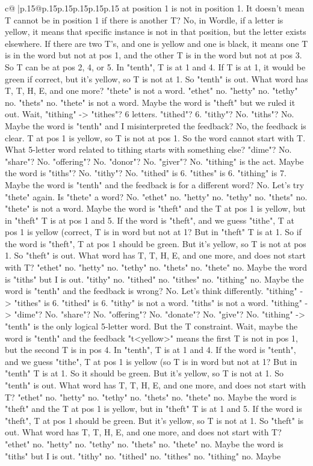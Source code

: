 \documentclass{article}
\begin{document}
{\begin{supertabular}{c@{$\;$}|p{.15\linewidth}@{}p{.15\linewidth}p{.15\linewidth}p{.15\linewidth}p{.15\linewidth}p{.15\linewidth}}
{{{at position 1 is not in position 1. It doesn't mean T cannot be in position 1 if there is another T? No, in Wordle, if a letter is yellow, it means that specific instance is not in that position, but the letter exists elsewhere. If there are two T's, and one is yellow and one is black, it means one T is in the word but not at pos 1, and the other T is in the word but not at pos 3. So T can be at pos 2, 4, or 5. In "tenth", T is at 1 and 4. If T is at 1, it would be green if correct, but it's yellow, so T is not at 1. So "tenth" is out. What word has T, T, H, E, and one more? "thete" is not a word. "ethet" no. "hetty" no. "tethy" no. "thets" no. "thete" is not a word. Maybe the word is "theft" but we ruled it out. Wait, "tithing" {-}> "tithes"? 6 letters. "tithed"? 6. "tithy"? No. "tiths"? No. Maybe the word is "tenth" and I misinterpreted the feedback? No, the feedback is clear. T at pos 1 is yellow, so T is not at pos 1. So the word cannot start with T. What 5{-}letter word related to tithing starts with something else? "dime"? No. "share"? No. "offering"? No. "donor"? No. "giver"? No. "tithing" is the act. Maybe the word is "tiths"? No. "tithy"? No. "tithed" is 6. "tithes" is 6. "tithing" is 7. Maybe the word is "tenth" and the feedback is for a different word? No. Let's try "thete" again. Is "thete" a word? No. "ethet" no. "hetty" no. "tethy" no. "thets" no. "thete" is not a word. Maybe the word is "theft" and the T at pos 1 is yellow, but in "theft" T is at pos 1 and 5. If the word is "theft", and we guess "tithe", T at pos 1 is yellow (correct, T is in word but not at 1? But in "theft" T is at 1. So if the word is "theft", T at pos 1 should be green. But it's yellow, so T is not at pos 1. So "theft" is out. What word has T, T, H, E, and one more, and does not start with T? "ethet" no. "hetty" no. "tethy" no. "thets" no. "thete" no. Maybe the word is "tiths" but I is out. "tithy" no. "tithed" no. "tithes" no. "tithing" no. Maybe the word is "tenth" and the feedback is wrong? No. Let's think differently. "tithing" {-}> "tithes" is 6. "tithed" is 6. "tithy" is not a word. "tiths" is not a word. "tithing" {-}> "dime"? No. "share"? No. "offering"? No. "donate"? No. "give"? No. "tithing" {-}> "tenth" is the only logical 5{-}letter word. But the T constraint. Wait, maybe the word is "tenth" and the feedback "t<yellow>" means the first T is not in pos 1, but the second T is in pos 4. In "tenth", T is at 1 and 4. If the word is "tenth", and we guess "tithe", T at pos 1 is yellow (so T is in word but not at 1? But in "tenth" T is at 1. So it should be green. But it's yellow, so T is not at 1. So "tenth" is out. What word has T, T, H, E, and one more, and does not start with T? "ethet" no. "hetty" no. "tethy" no. "thets" no. "thete" no. Maybe the word is "theft" and the T at pos 1 is yellow, but in "theft" T is at 1 and 5. If the word is "theft", T at pos 1 should be green. But it's yellow, so T is not at 1. So "theft" is out. What word has T, T, H, E, and one more, and does not start with T? "ethet" no. "hetty" no. "tethy" no. "thets" no. "thete" no. Maybe the word is "tiths" but I is out. "tithy" no. "tithed" no. "tithes" no. "tithing" no. Maybe }}}
\end{supertabular}}
\end{document}
